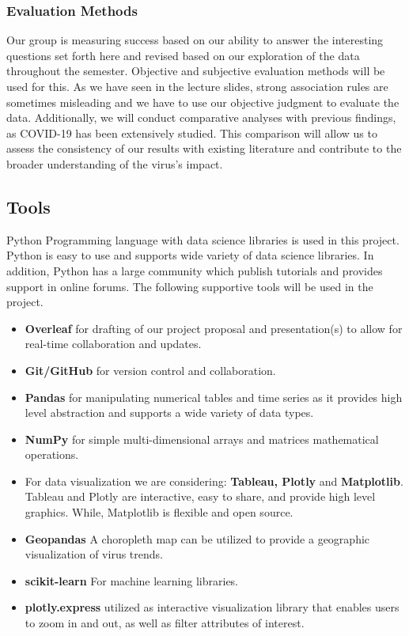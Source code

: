 \documentclass[sigconf,screen,nonacm]{acmart}
\begin{document}
\subsubsection{Evaluation Methods}
Our group is measuring success based on our ability to answer the interesting questions set forth here and revised based on our exploration of the data throughout the semester. Objective and subjective evaluation methods will be used for this. As we have seen in the lecture slides, strong association rules are sometimes misleading and we have to use our objective judgment to evaluate the data. Additionally, we will conduct comparative analyses with previous findings, as COVID-19 has been extensively studied. This comparison will allow us to assess the consistency of our results with existing literature and contribute to the broader understanding of the virus's impact.

\subsection{Tools}
Python Programming language with data science libraries is used in this project. Python is easy to use and supports wide variety of data science libraries. In addition, Python has a large community which publish tutorials and provides support in online forums.
The following supportive tools will be used in the project. 
\begin{itemize}
\item \textbf{Overleaf} for drafting of our project proposal and presentation(s) to allow for real-time collaboration and updates.

\item \textbf{Git/GitHub} for version control and collaboration.
\item \textbf{Pandas} for manipulating numerical tables and time series as it provides high level abstraction and supports a wide variety of data types.
\item \textbf{NumPy} for simple multi-dimensional arrays and matrices mathematical operations.
\item For data visualization we are considering: \textbf{Tableau, Plotly} and \textbf{Matplotlib}. Tableau and Plotly are interactive, easy to share, and provide high level graphics. While, Matplotlib is flexible and open source. 
\item \textbf{Geopandas} A choropleth map can be utilized to provide a geographic visualization of virus trends.
\item \textbf{scikit-learn} For machine learning libraries.
\item \textbf{plotly.express} utilized as interactive visualization library that enables users to zoom in and out, as well as filter attributes of interest.

\end{itemize}
\end{document}
